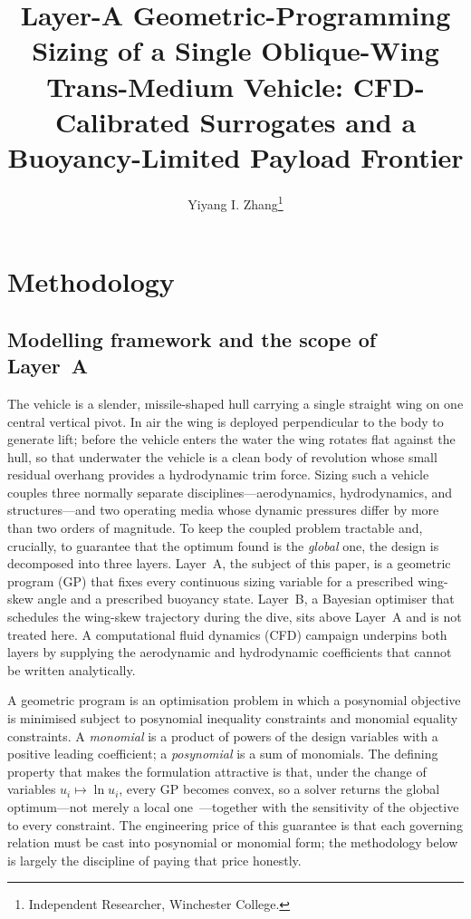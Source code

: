 \documentclass[conf]{new-aiaa}
\title{Layer-A Geometric-Programming Sizing of a Single Oblique-Wing Trans-Medium Vehicle: CFD-Calibrated Surrogates and a Buoyancy-Limited Payload Frontier}
\author{Yiyang I. Zhang\footnote{Independent Researcher, Winchester College.}}
\affil{Winchester College, Winchester, United Kingdom}
\begin{document}
\maketitle

\section{Methodology}

\subsection{Modelling framework and the scope of Layer~A}
The vehicle is a slender, missile-shaped hull carrying a single straight wing on one central
vertical pivot. In air the wing is deployed perpendicular to the body to generate lift; before the
vehicle enters the water the wing rotates flat against the hull, so that underwater the vehicle is a
clean body of revolution whose small residual overhang provides a hydrodynamic trim force. Sizing
such a vehicle couples three normally separate disciplines---aerodynamics, hydrodynamics, and
structures---and two operating media whose dynamic pressures differ by more than two orders of
magnitude. To keep the coupled problem tractable and, crucially, to guarantee that the optimum found
is the \emph{global} one, the design is decomposed into three layers. Layer~A, the subject of this
paper, is a geometric program (GP) that fixes every continuous sizing variable for a prescribed
wing-skew angle and a prescribed buoyancy state. Layer~B, a Bayesian optimiser that schedules the
wing-skew trajectory during the dive, sits above Layer~A and is not treated here. A computational
fluid dynamics (CFD) campaign underpins both layers by supplying the aerodynamic and hydrodynamic
coefficients that cannot be written analytically.

A geometric program is an optimisation problem in which a posynomial objective is minimised subject
to posynomial inequality constraints and monomial equality constraints. A \emph{monomial} is a
product of powers of the design variables with a positive leading coefficient; a \emph{posynomial}
is a sum of monomials. The defining property that makes the formulation attractive is that, under the
change of variables $u_i\mapsto\ln u_i$, every GP becomes convex, so a solver returns the global
optimum---not merely a local one~\cite{boyd2007tutorial}---together with the sensitivity of the objective to every
constraint. The engineering price of this guarantee is that each governing relation must be cast into
posynomial or monomial form; the methodology below is largely the discipline of paying that price
honestly.
\end{document}
